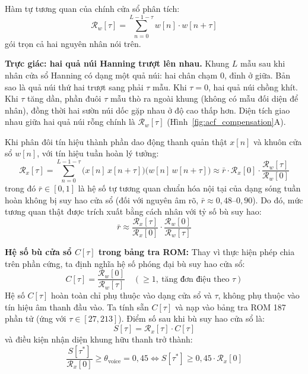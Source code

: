 \documentclass[11pt,a4paper]{article}
\begin{document}
Hàm tự tương quan của chính cửa sổ phân tích:
\begin{equation}
\mathcal{R}_w[\tau] = \sum_{n=0}^{L - 1 - \tau} w[n] \cdot w[n+\tau]
\end{equation}
gói trọn cả hai nguyên nhân nói trên.

\textbf{Trực giác: hai quả núi Hanning trượt lên nhau.}
Khung $L$ mẫu sau khi nhân cửa sổ Hanning có dạng một quả núi: hai chân chạm $0$, đỉnh ở giữa. Bản sao là quả núi thứ hai trượt sang phải $\tau$ mẫu. Khi $\tau = 0$, hai quả núi chồng khít. Khi $\tau$ tăng dần, phần đuôi $\tau$ mẫu thò ra ngoài khung (không có mẫu đối diện để nhân), đồng thời hai sườn núi dốc gặp nhau ở độ cao thấp hơn. Diện tích giao nhau giữa hai quả núi rỗng chính là $\mathcal{R}_w[\tau]$ (Hình~\ref{fig:acf_compensation}A).

Khi phân đôi tín hiệu thành phần dao động thanh quản thật $x[n]$ và khuôn cửa sổ $w[n]$, với tín hiệu tuần hoàn lý tưởng:
\begin{equation}
\mathcal{R}_x[\tau] = \sum_{n=0}^{L-1-\tau} \big(x[n]\,x[n+\tau]\big)\big(w[n]\,w[n+\tau]\big) \approx \bar{r} \cdot \mathcal{R}_x[0] \cdot \frac{\mathcal{R}_w[\tau]}{\mathcal{R}_w[0]}
\label{eq:rx_approx_bar_r}
\end{equation}
trong đó $\bar{r} \in [0, 1]$ là hệ số tự tương quan chuẩn hóa nội tại của dạng sóng tuần hoàn không bị suy hao cửa sổ (đối với nguyên âm rõ, $\bar{r} \approx 0{,}48\text{--}0{,}90$). Do đó, mức tương quan thật được trích xuất bằng cách nhân với tỷ số bù suy hao:
\begin{equation}
\bar{r} \approx \frac{\mathcal{R}_x[\tau]}{\mathcal{R}_x[0]} \cdot \frac{\mathcal{R}_w[0]}{\mathcal{R}_w[\tau]}
\end{equation}

\textbf{Hệ số bù cửa sổ $C[\tau]$ trong bảng tra ROM:}
Thay vì thực hiện phép chia trên phần cứng, ta định nghĩa hệ số phóng đại bù suy hao cửa sổ:
\begin{equation}
C[\tau] = \frac{\mathcal{R}_w[0]}{\mathcal{R}_w[\tau]} \quad (\ge 1,\ \text{tăng đơn điệu theo } \tau)
\label{eq:c_tau_def}
\end{equation}
Hệ số $C[\tau]$ hoàn toàn chỉ phụ thuộc vào dạng cửa sổ và $\tau$, không phụ thuộc vào tín hiệu âm thanh đầu vào. Ta tính sẵn $C[\tau]$ và nạp vào bảng tra ROM 187 phần tử (ứng với $\tau \in [27, 213]$). Điểm số sau khi bù suy hao cửa sổ là:
\begin{equation}
S[\tau] = \mathcal{R}_x[\tau] \cdot C[\tau]
\end{equation}
và điều kiện nhận diện khung hữu thanh trở thành:
\begin{equation}
\frac{S[\tau^*]}{\mathcal{R}_x[0]} \ge \theta_{\text{voice}} = 0{,}45 \iff S[\tau^*] \ge 0{,}45 \cdot \mathcal{R}_x[0]
\end{equation}
\end{document}
